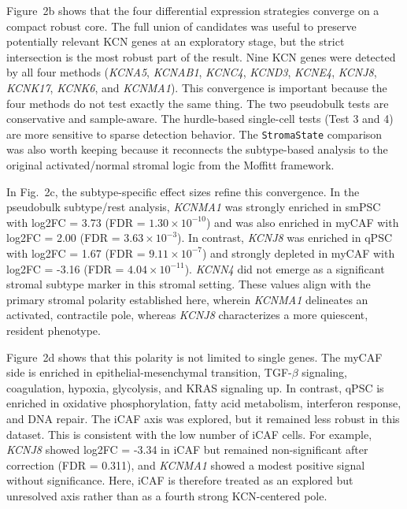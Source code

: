 \documentclass[11pt,a4paper]{article}
\begin{document}
Figure~2b shows that the four differential expression strategies converge on a compact robust core. The full union of candidates was useful to preserve potentially relevant KCN genes at an exploratory stage, but the strict intersection is the most robust part of the result. Nine KCN genes were detected by all four methods (\textit{KCNA5}, \textit{KCNAB1}, \textit{KCNC4}, \textit{KCND3}, \textit{KCNE4}, \textit{KCNJ8}, \textit{KCNK17}, \textit{KCNK6}, and \textit{KCNMA1}). This convergence is important because the four methods do not test exactly the same thing. The two pseudobulk tests are conservative and sample-aware. The hurdle-based single-cell tests (Test 3 and 4) are more sensitive to sparse detection behavior. The \texttt{StromaState} comparison was also worth keeping because it reconnects the subtype-based analysis to the original activated/normal stromal logic from the Moffitt framework.

In Fig.~2c, the subtype-specific effect sizes refine this convergence. In the pseudobulk subtype/rest analysis, \textit{KCNMA1} was strongly enriched in smPSC with log2FC = 3.73 (FDR = $1.30\times 10^{-10}$) and was also enriched in myCAF with log2FC = 2.00 (FDR = $3.63\times 10^{-3}$). In contrast, \textit{KCNJ8} was enriched in qPSC with log2FC = 1.67 (FDR = $9.11\times 10^{-7}$) and strongly depleted in myCAF with log2FC = -3.16 (FDR = $4.04\times 10^{-11}$). \textit{KCNN4} did not emerge as a significant stromal subtype marker in this stromal setting. These values align with the primary stromal polarity established here, wherein \textit{KCNMA1} delineates an activated, contractile pole, whereas \textit{KCNJ8} characterizes a more quiescent, resident phenotype.

Figure~2d shows that this polarity is not limited to single genes. The myCAF side is enriched in epithelial-mesenchymal transition, TGF-$\beta$ signaling, coagulation, hypoxia, glycolysis, and KRAS signaling up. In contrast, qPSC is enriched in oxidative phosphorylation, fatty acid metabolism, interferon response, and DNA repair. The iCAF axis was explored, but it remained less robust in this dataset. This is consistent with the low number of iCAF cells. For example, \textit{KCNJ8} showed log2FC = -3.34 in iCAF but remained non-significant after correction (FDR = 0.311), and \textit{KCNMA1} showed a modest positive signal without significance. Here, iCAF is therefore treated as an explored but unresolved axis rather than as a fourth strong KCN-centered pole.
\end{document}
